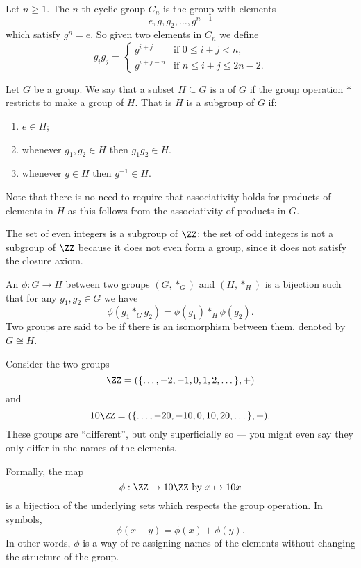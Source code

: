 \begin{example}
Let $n\ge1$. The $n$-th cyclic group $C_n$ is the group with elements
\[ e, g, g_2, \dots, g^{n-1} \]
which satisfy $g^n=e$. So given two elements in $C_n$ we define
\[ g_ig_j=\begin{cases}
g^{i+j} & \text{if } 0\le i+j<n, \\
g^{i+j-n} & \text{if } n\le i+j\le 2n-2.
\end{cases} \]
\end{example}
\pagebreak

\begin{definition}[Subgroup]
Let $G$ be a group. We say that a subset $H \subseteq G$ is a  of $G$ if the group operation $\ast$ restricts to make a group of $H$. That is $H$ is a subgroup of $G$ if:
\begin{enumerate}[label=(\roman*)]
\item $e \in H$;
\item whenever $g_1,g_2\in H$ then $g_1g_2 \in H$.
\item whenever $g \in H$ then $g^{-1} \in H$.
\end{enumerate}
\end{definition}

\begin{remark}
Note that there is no need to require that associativity holds for products of elements in $H$ as this follows from the associativity of products in $G$.
\end{remark}

\begin{example}
The set of even integers is a subgroup of $\ZZ$; the set of odd integers is not a subgroup of $\ZZ$ because it does not even form a group, since it does not satisfy the closure axiom.
\end{example}

\begin{definition}[Isomorphism]
An  $\phi: G \to H$ between two groups $(G,\ast_G)$ and $(H,\ast_H)$ is a bijection such that for any $g_1,g_2 \in G$ we have
\[ \phi(g_1 \ast_G g_2) = \phi(g_1) \ast_H \phi(g_2). \]
Two groups are said to be  if there is an isomorphism between them, denoted by $G \cong H$.
\end{definition}

\begin{example}[$\ZZ\cong10\ZZ$]
Consider the two groups
\[ \ZZ = (\{\dots, -2, -1, 0, 1, 2, \dots\}, +) \] and
\[ 10\ZZ = (\{\dots, -20, -10, 0, 10, 20, \dots\}, +). \]
These groups are ``different'', but only superficially so --- you might even say they only differ in the names of the elements.

Formally, the map
\[ \phi: \ZZ \to 10\ZZ \text{ by } x \mapsto 10x \]
is a bijection of the underlying sets which respects the group operation. In symbols,
\[ \phi(x+y) = \phi(x) + \phi(y). \]
In other words, $\phi$ is a way of re-assigning names of the elements without changing the structure of the group.
\end{example}
\pagebreak

